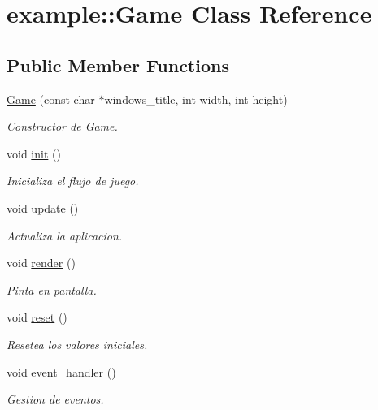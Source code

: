 \hypertarget{classexample_1_1_game}{}\section{example\+::Game Class Reference}
\label{classexample_1_1_game}
\subsection*{Public Member Functions}
\begin{DoxyCompactItemize}
\item 
\mbox{\hyperlink{classexample_1_1_game_a06e57e88bb85529092146ca7f0ef5030}{Game}} (const char $\ast$windows\+\_\+title, int width, int height)
\begin{DoxyCompactList}\small\item\em Constructor de \mbox{\hyperlink{classexample_1_1_game}{Game}}. \end{DoxyCompactList}\item 
void \mbox{\hyperlink{classexample_1_1_game_ae43c4f24d071be6210e9273fa5bd6479}{init}} ()
\begin{DoxyCompactList}\small\item\em Inicializa el flujo de juego. \end{DoxyCompactList}\item 
void \mbox{\hyperlink{classexample_1_1_game_a01f28031d3b384412bdac6e433171743}{update}} ()
\begin{DoxyCompactList}\small\item\em Actualiza la aplicacion. \end{DoxyCompactList}\item 
void \mbox{\hyperlink{classexample_1_1_game_a80ca8afc0d6e9d533d4b7ea0fd333381}{render}} ()
\begin{DoxyCompactList}\small\item\em Pinta en pantalla. \end{DoxyCompactList}\item 
void \mbox{\hyperlink{classexample_1_1_game_a3f27f46dd53f8fe477772c2e6bbbef60}{reset}} ()
\begin{DoxyCompactList}\small\item\em Resetea los valores iniciales. \end{DoxyCompactList}\item 
void \mbox{\hyperlink{classexample_1_1_game_ae4383cfb01609df636d51184e1b4fa63}{event\+\_\+handler}} ()
\begin{DoxyCompactList}\small\item\em Gestion de eventos. \end{DoxyCompactList}\end{DoxyCompactItemize}


